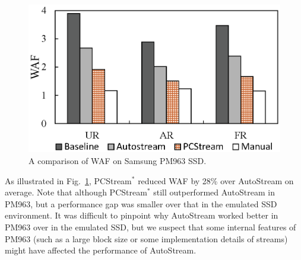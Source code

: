 \begin{figure}[t]
	\centering
	\includegraphics[scale=0.6]{figure/pcstream/result_ssd}
	\caption{A comparison of WAF on Samsung PM963 SSD.}
	\label{fig:result_ssd}
\end{figure}


As illustrated in Fig.~\ref{fig:result_ssd}, \textsf{\small PCStream$^*$} reduced WAF by
28\% over \textsf{\small AutoStream} on average.  
Note that although \textsf{\small PCStream$^*$} still outperformed \textsf{\small AutoStream} in PM963, 
but a performance gap was smaller over that
in the emulated SSD environment.  It was difficult to pinpoint why
\textsf{\small AutoStream} worked better in PM963 over in the emulated SSD, but we
suspect that some internal features of PM963 (such as a large block size or some implementation details of streams) %
might have affected the performance of \textsf{\small AutoStream}.


